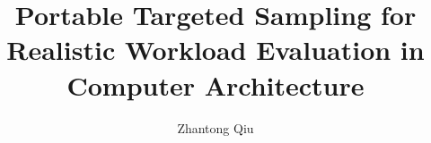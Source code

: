 \documentclass[12pt,MS]{ucdavisthesis}
\title{Portable Targeted Sampling for Realistic Workload Evaluation in Computer Architecture}
\author{Zhantong Qiu}
\begin{document}
\newcommand{\bibfont}{\singlespacing}



\makeintropages




























% 
\end{document}
